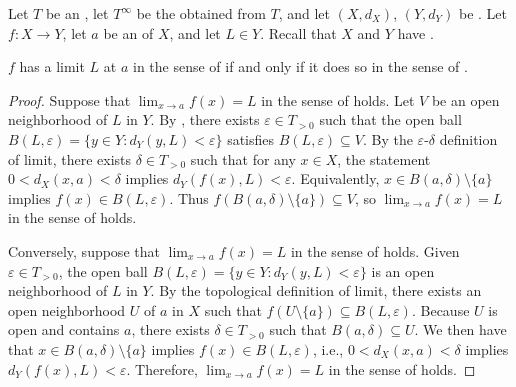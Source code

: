 \begin{proposition} \label{proposition:epsilon_delta_definition_of_limit_of_functions_on_extended_metric_spaces_are_equivalent_to_topological_limit_definition}
    Let $T$ be an , let $T^\infty$ be the  obtained from $T$, and let $(X,d_X)$, $(Y,d_Y)$ be . Let $f : X \to Y$, let $a$ be an  of $X$, and let $L \in Y$. Recall that $X$ and $Y$ have .

    $f$ has a limit $L$ at $a$ in the sense of  if and only if it does so in the sense of .
\end{proposition}
\begin{proof}
    Suppose that $\lim_{x \to a} f(x) = L$ in the sense of  holds. Let $V$ be an open neighborhood of $L$ in $Y$. By , there exists $\varepsilon \in T_{>0}$ such that the open ball $B(L, \varepsilon) = \{y \in Y : d_Y(y,L) < \varepsilon\}$ satisfies $B(L, \varepsilon) \subseteq V$. By the $\varepsilon$-$\delta$ definition of limit, there exists $\delta \in T_{>0}$ such that for any $x \in X$, the statement $0 < d_X(x,a) < \delta$ implies $d_Y(f(x), L) < \varepsilon$. Equivalently, $x \in B(a, \delta) \setminus \{a\}$ implies $f(x) \in B(L, \varepsilon)$. Thus $f(B(a, \delta) \setminus \{a\}) \subseteq V$, so $\lim_{x \to a} f(x) = L$ in the sense of  holds.

    Conversely, suppose that $\lim_{x \to a} f(x) = L$ in the sense of  holds. Given $\varepsilon \in T_{>0}$, the open ball $B(L, \varepsilon) = \{y \in Y : d_Y(y,L) < \varepsilon\}$ is an open neighborhood of $L$ in $Y$. By the topological definition of limit, there exists an open neighborhood $U$ of $a$ in $X$ such that $f(U \setminus \{a\}) \subseteq B(L, \varepsilon)$. Because $U$ is open and contains $a$, there exists $\delta \in T_{>0}$ such that $B(a, \delta) \subseteq U$. We then have that $x \in B(a, \delta) \setminus \{a\}$ implies $f(x) \in B(L, \varepsilon)$, i.e., $0 < d_X(x,a) < \delta$ implies $d_Y(f(x), L) < \varepsilon$. Therefore, $\lim_{x \to a} f(x) = L$ in the sense of  holds.
\end{proof}